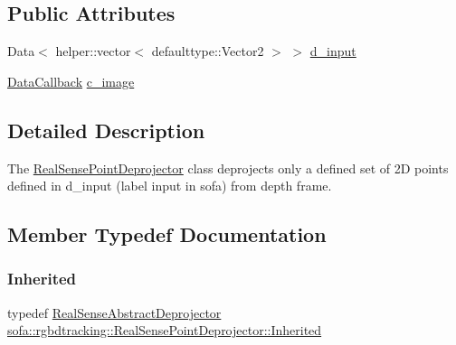 \subsection*{Public Attributes}
\begin{DoxyCompactItemize}
\item 
Data$<$ helper\+::vector$<$ defaulttype\+::\+Vector2 $>$ $>$ \hyperlink{classsofa_1_1rgbdtracking_1_1_real_sense_point_deprojector_a93e870b27e925201cd94f0e3c353ba94}{d\+\_\+input}
\item 
\hyperlink{namespacesofa_1_1rgbdtracking_a00834a9204a667746fef9a402ccbfb55}{Data\+Callback} \hyperlink{classsofa_1_1rgbdtracking_1_1_real_sense_point_deprojector_a66a99e38b3bdc576ed7da5df8307aa89}{c\+\_\+image}
\end{DoxyCompactItemize}


\subsection{Detailed Description}
The \hyperlink{classsofa_1_1rgbdtracking_1_1_real_sense_point_deprojector}{Real\+Sense\+Point\+Deprojector} class deprojects only a defined set of 2D points defined in d\+\_\+input (label input in sofa) from depth frame. 

\subsection{Member Typedef Documentation}
\mbox{\label{classsofa_1_1rgbdtracking_1_1_real_sense_point_deprojector_a06e1fe2c0a7478ad85adf5d3add317f2}} 
\subsubsection{\texorpdfstring{Inherited}{Inherited}}
{\footnotesize\ttfamily typedef \hyperlink{classsofa_1_1rgbdtracking_1_1_real_sense_abstract_deprojector}{Real\+Sense\+Abstract\+Deprojector} \hyperlink{classsofa_1_1rgbdtracking_1_1_real_sense_point_deprojector_a06e1fe2c0a7478ad85adf5d3add317f2}{sofa\+::rgbdtracking\+::\+Real\+Sense\+Point\+Deprojector\+::\+Inherited}}



